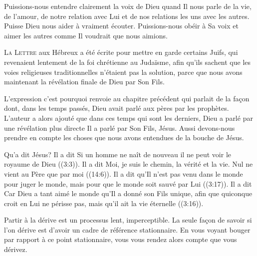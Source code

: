 Puissions-nous entendre clairement la voix de Dieu quand Il nous parle
 de la vie, de l'amour, de notre relation avec Lui et de nos relations
 les uns avec les autres. Puisse Dieu nous aider à vraiment écouter.
 Puissions-nous obéir à Sa voix et aimer les autres comme Il voudrait
 que nous aimions.

\dvrule






\lettrine{L}{a Lettre} aux Hébreux a été écrite pour mettre en garde
 certains Juifs, qui revenaient lentement de la foi chrétienne au Judaïsme,
 afin qu'ils sachent que les voies religieuses traditionnelles
 n'étaient pas la solution, parce que nous avons maintenant
 la révélation finale de Dieu par Son Fils. 

L'expression \Og c'est pourquoi \Fg{} renvoie au chapitre précédent
 qui parlait de la fa\c{c}on dont, dans les temps passés,
 Dieu avait parlé aux pères par les prophètes.
 L'auteur a alors ajouté que dans ces temps qui sont les derniers,
 Dieu a parlé par une révélation plus directe
 \ocadr Il a parlé par Son Fils, Jésus.
 Aussi devons-nous prendre en compte les choses que nous avons entendues
 de la bouche de Jésus. 


Qu'a dit Jésus? Il a dit\frcolon{} 
 \Og Si un homme ne naît de nouveau il ne peut voir le royaume de Dieu \Fg{}
 ((3:3)).
 Il a dit\frcolon{} 
 \Og Moi, je suis le chemin, la vérité et la vie.
 Nul ne vient au Père que par moi \Fg{} ((14:6)).
 Il a dit qu'Il n'est pas venu \Og dans le monde pour juger le monde,
 mais pour que le monde soit sauvé par Lui \Fg{} ((3:17)).
 Il a dit\frcolon{} 
 \Og Car Dieu a tant aimé le monde qu'Il a donné son Fils unique,
 afin que quiconque croit en Lui ne périsse pas,
 mais qu'il ait la vie éternelle \Fg{} ((3:16)). 

Partir à la dérive est un processus lent, imperceptible.
 La seule fa\c{c}on de savoir si l'on dérive est d'avoir un cadre de référence
 stationnaire.
 En vous voyant bouger par rapport à ce point stationnaire,
 vous vous rendez alors compte que vous dérivez. 

